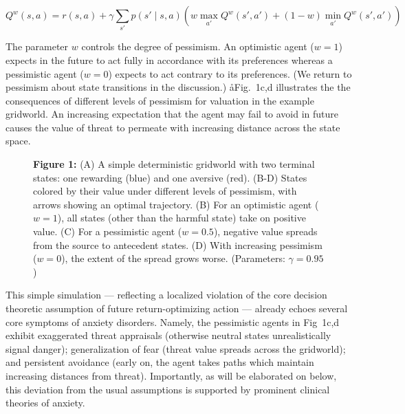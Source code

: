 \documentclass[11pt]{article} %
\begin{document}
\begin{equation*}
Q^w(s,a) = r(s,a) + \gamma \sum_{s'} p(s' \mid s,a) \left( w \max_{a'} Q^w(s',a') + (1 - w) \min_{a'} Q^w(s',a') \right)
\end{equation*}

The parameter $w$ controls the degree of pessimism. An optimistic agent ($w = 1$) expects in the future to act fully in accordance with its preferences whereas a pessimistic agent ($w = 0$) expects to act contrary to its preferences. (We return to pessimism about state transitions in the discussion.) åFig.~1c,d illustrates the the consequences of different levels of pessimism for valuation in the example gridworld. An increasing expectation that the agent may fail to avoid in future causes the value of threat to permeate with increasing distance across the state space.

\begin{figure}
  \centerline{%
  }
  \par \textbf{Figure 1:} (A) A simple deterministic gridworld with two terminal states: one rewarding (blue) and one aversive (red). (B-D) States colored by their value under different levels of pessimism, with arrows showing an optimal trajectory. (B) For an optimistic agent ($w=1$), all states (other than the harmful state) take on positive value. (C) For a pessimistic agent ($w=0.5$), negative value spreads from the source to antecedent states. (D) With increasing pessimism ($w=0$), the extent of the spread grows worse. (Parameters: $\gamma = 0.95$)
\end{figure}

This simple simulation --- reflecting a localized violation of the core decision theoretic assumption of future return-optimizing action --- already echoes several core symptoms of anxiety disorders. Namely, the pessimistic agents in Fig~1c,d exhibit exaggerated threat appraisals (otherwise neutral states unrealistically signal danger); generalization of fear (threat value spreads across the gridworld); and persistent avoidance (early on, the agent takes paths which maintain increasing distances from threat). Importantly, as will be elaborated on below, this deviation from the usual assumptions is supported by prominent clinical theories of anxiety.
\end{document}
